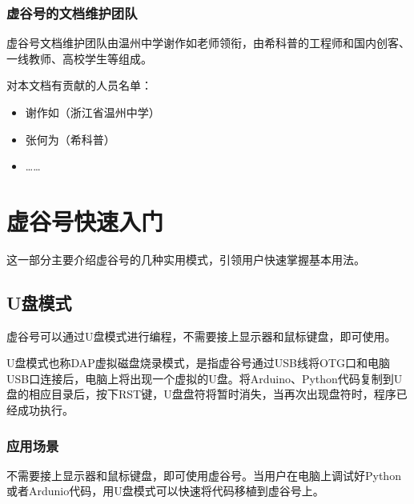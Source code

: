 \documentclass[letterpaper,10pt,english]{sphinxmanual}
\begin{document}
\subsection{虚谷号的文档维护团队}
\label{\detokenize{01.about/1.5-docs:id4}}
虚谷号文档维护团队由温州中学谢作如老师领衔，由希科普的工程师和国内创客、一线教师、高校学生等组成。

对本文档有贡献的人员名单：
\begin{itemize}
\item {} 
谢作如（浙江省温州中学）

\item {} 
张何为（希科普）

\item {} 
……

\end{itemize}


\chapter{虚谷号快速入门}
\label{\detokenize{02.quick/index::doc}}\label{\detokenize{02.quick/index:id1}}
这一部分主要介绍虚谷号的几种实用模式，引领用户快速掌握基本用法。


\section{U盘模式}
\label{\detokenize{02.quick/2.1-dap::doc}}\label{\detokenize{02.quick/2.1-dap:u}}
虚谷号可以通过U盘模式进行编程，不需要接上显示器和鼠标键盘，即可使用。

U盘模式也称DAP虚拟磁盘烧录模式，是指虚谷号通过USB线将OTG口和电脑USB口连接后，电脑上将出现一个虚拟的U盘。将Arduino、Python代码复制到U盘的相应目录后，按下RST键，U盘盘符将暂时消失，当再次出现盘符时，程序已经成功执行。


\subsection{应用场景}
\label{\detokenize{02.quick/2.1-dap:id1}}
不需要接上显示器和鼠标键盘，即可使用虚谷号。当用户在电脑上调试好Python或者Ardunio代码，用U盘模式可以快速将代码移植到虚谷号上。
\end{document}
